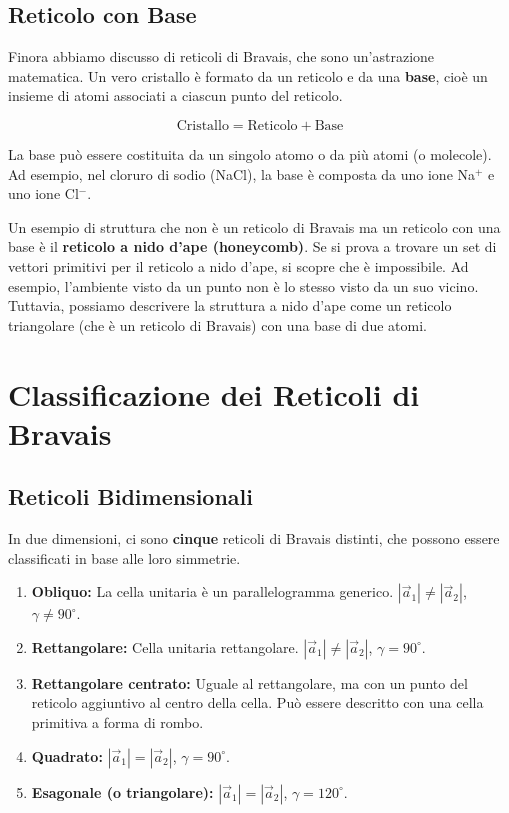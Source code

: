 \subsection*{Reticolo con Base}

Finora abbiamo discusso di reticoli di Bravais, che sono un'astrazione matematica. Un vero cristallo è formato da un reticolo e da una \textbf{base}, cioè un insieme di atomi associati a ciascun punto del reticolo.

\begin{equation}
 \text{Cristallo} = \text{Reticolo} + \text{Base}
\end{equation}

La base può essere costituita da un singolo atomo o da più atomi (o molecole). Ad esempio, nel cloruro di sodio (NaCl), la base è composta da uno ione Na$^+$ e uno ione Cl$^-$.

Un esempio di struttura che non è un reticolo di Bravais ma un reticolo con una base è il \textbf{reticolo a nido d'ape (honeycomb)}. Se si prova a trovare un set di vettori primitivi per il reticolo a nido d'ape, si scopre che è impossibile. Ad esempio, l'ambiente visto da un punto non è lo stesso visto da un suo vicino. Tuttavia, possiamo descrivere la struttura a nido d'ape come un reticolo triangolare (che è un reticolo di Bravais) con una base di due atomi.

\section*{Classificazione dei Reticoli di Bravais}

\subsection*{Reticoli Bidimensionali}

In due dimensioni, ci sono \textbf{cinque} reticoli di Bravais distinti, che possono essere classificati in base alle loro simmetrie.
\begin{enumerate}
    \item \textbf{Obliquo:} La cella unitaria è un parallelogramma generico. $|\vec{a}_1| \neq |\vec{a}_2|$, $\gamma \neq 90^\circ$.
    \item \textbf{Rettangolare:} Cella unitaria rettangolare. $|\vec{a}_1| \neq |\vec{a}_2|$, $\gamma = 90^\circ$.
    \item \textbf{Rettangolare centrato:} Uguale al rettangolare, ma con un punto del reticolo aggiuntivo al centro della cella. Può essere descritto con una cella primitiva a forma di rombo.
    \item \textbf{Quadrato:} $|\vec{a}_1| = |\vec{a}_2|$, $\gamma = 90^\circ$.
    \item \textbf{Esagonale (o triangolare):} $|\vec{a}_1| = |\vec{a}_2|$, $\gamma = 120^\circ$.
\end{enumerate}

